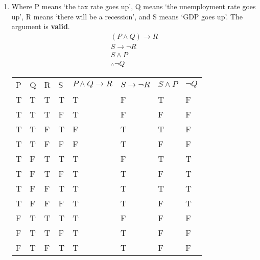 \documentclass[a4paper, 11pt]{article}
\begin{document}
\begin{enumerate}
\begin{enumerate}
          \item Where P means `the tax rate goes up', Q means `the unemployment rate goes up', R means `there will be a recession', and S means `GDP goes up'. The argument is \textbf{valid}.
                \begin{align*}
                  (P \wedge Q) \rightarrow R \\
                  S \rightarrow \neg R       \\
                  S \wedge P                 \\
                  \therefore \neg Q
                \end{align*}
                \begin{table}[htbp]
                  \centering
                  \begin{tabular}{llllllll}
                    P & Q & R & S & $P \wedge Q \rightarrow R$ & $S \rightarrow \neg R$ & $S \wedge P$ & $\neg Q$ \\
                    T & T & T & T & T                          & F                      & T            & F        \\
                    T & T & T & F & T                          & F                      & F            & F        \\
                    T & T & F & T & F                          & T                      & T            & F        \\
                    T & T & F & F & F                          & T                      & F            & F        \\
                    T & F & T & T & T                          & F                      & T            & T        \\
                    T & F & T & F & T                          & T                      & F            & T        \\
                    T & F & F & T & T                          & T                      & T            & T        \\
                    T & F & F & F & T                          & T                      & F            & T        \\
                    F & T & T & T & T                          & F                      & F            & F        \\
                    F & T & T & F & T                          & T                      & F            & F        \\
                    F & T & F & T & T                          & T                      & F            & F        \\

\end{tabular}
\end{table}
\end{enumerate}
\end{enumerate}
\end{document}
